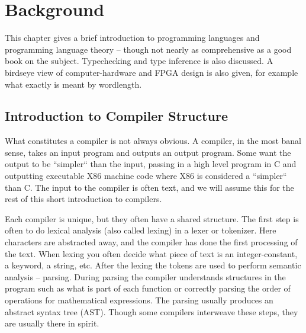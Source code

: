 \chapter{Background}
\label{chaBackground}
This chapter gives a brief introduction to programming languages and programming language theory -- though not nearly as comprehensive as a good book on the subject. Typechecking and type inference is also discussed. A birdseye view of computer-hardware and FPGA design is also given, for example what exactly is meant by wordlength.

% 


\section{Introduction to Compiler Structure}
What constitutes a compiler is not always obvious. A compiler, in the most banal sense, takes an input program and outputs an output program. Some want the output to be ``simpler`` than the input, passing in a high level program in C and outputting executable X86 machine code where X86 is considered a ``simpler`` than C. The input to the compiler is often text, and we will assume this for the rest of this short introduction to compilers.

Each compiler is unique, but they often have a shared structure. The first step is often to do lexical analysis (also called lexing) in a lexer or tokenizer. Here characters are abstracted away, and the compiler has done the first processing of the text. When lexing you often decide what piece of text is an integer-constant, a keyword, a string, etc. After the lexing the tokens are used to perform semantic analysis -- parsing. During parsing the compiler understands structures in the program such as what is part of each function or correctly parsing the order of operations for mathematical expressions. The parsing usually produces an abstract syntax tree (AST). Though some compilers interweave these steps, they are usually there in spirit.

